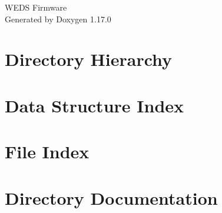\documentclass[twoside]{book}
\newcommand{\+}{\discretionary{\mbox{\scriptsize$\hookleftarrow$}}{}{}}
\newcommand{\clearemptydoublepage}{%
    \newpage{\pagestyle{empty}\cleardoublepage}%
  }
\begin{document}
  \raggedbottom
    \hypersetup{pageanchor=false,
                bookmarksnumbered=true,
                pdfencoding=unicode
               }
  \begin{titlepage}
  \vspace*{7cm}
  \begin{center}%
  {\Large WEDS Firmware}\\
  \vspace*{1cm}
  {\large Generated by Doxygen 1.17.0}\\
  \end{center}
  \end{titlepage}
  \clearemptydoublepage
  \tableofcontents
  \clearemptydoublepage
  \hypersetup{pageanchor=true}
\chapter{Directory Hierarchy}

\chapter{Data Structure Index}

\chapter{File Index}

\chapter{Directory Documentation}


















\end{document}
